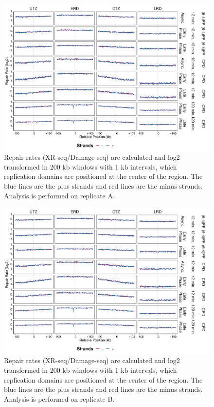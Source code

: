 \begin{figure}[H]
\begin{center}
\includegraphics[width=\textwidth]{Chapters/7_appendix/figures/supfig20}
\caption[Repair rates of replication domains in 200 kb (replicate A).]{Repair rates (XR-seq/Damage-seq) are calculated and log2 transformed in 200 kb windows with 1 kb intervals, which replication domains are positioned at the center of the region. The blue lines are the plus strands and red lines are the minus strands. Analysis is performed on replicate A.}
\label{supfig:repairrate200repdomainA}
\end{center}
\end{figure}

\begin{figure}[H]
\begin{center}
\includegraphics[width=\textwidth]{Chapters/7_appendix/figures/supfig21}
\caption[Repair rates of replication domains in 200 kb (replicate B).]{Repair rates (XR-seq/Damage-seq) are calculated and log2 transformed in 200 kb windows with 1 kb intervals, which replication domains are positioned at the center of the region. The blue lines are the plus strands and red lines are the minus strands. Analysis is performed on replicate B.}
\label{supfig:repairrate200repdomainB}
\end{center}
\end{figure}

